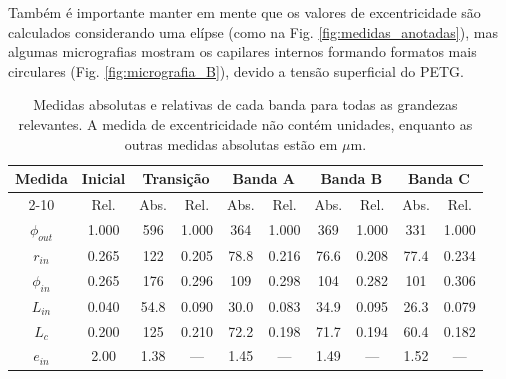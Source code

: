 \documentclass[12pt,a4paper]{article}
\begin{document}
  Também é importante manter em mente que os valores de excentricidade são calculados considerando uma elípse (como na Fig. \ref{fig:medidas_anotadas}), mas algumas micrografias mostram os capilares internos formando formatos mais circulares (Fig. \ref{fig:micrografia_B}), devido a tensão superficial do PETG.

  \begin{table}[H]
    \centering
    \begin{tabular}{c|c|cc|cc|cc|cc}
      \multirow{2}{*}{Medida} & Inicial & \multicolumn{2}{c|}{Transição} & \multicolumn{2}{c|}{Banda A} & \multicolumn{2}{c|}{Banda B} & \multicolumn{2}{c}{Banda C} \\
      \cline{2-10}
      & Rel. & Abs. & Rel. & Abs. & Rel. & Abs. & Rel. & Abs. & Rel. \\
      \hline
      $\phi_{out}$       & 1.000
                   & 596 & 1.000
                   & 364 & 1.000
                   & 369 & 1.000
                   & 331 & 1.000 \\
      $r_{in}$        & 0.265
               & 122 & 0.205
               & 78.8 & 0.216
               & 76.6 & 0.208
               & 77.4 & 0.234 \\
      $\phi_{in}$       & 0.265
                  & 176 & 0.296
                  & 109 & 0.298
                  & 104 & 0.282
                  & 101 & 0.306 \\
      $L_{in}$        & 0.040
               & 54.8 & 0.090
               & 30.0 & 0.083
               & 34.9 & 0.095
               & 26.3 & 0.079 \\
      $L_{c}$        & 0.200
              & 125 & 0.210
              & 72.2 & 0.198
              & 71.7 & 0.194
              & 60.4 & 0.182 \\
      $e_{in}$       & 2.00
              & 1.38 & ---
              & 1.45 & ---
              & 1.49 & ---
              & 1.52 & --- \\
    \end{tabular}
    \caption{Medidas absolutas e relativas de cada banda para todas as grandezas relevantes.
    A medida de excentricidade não contém unidades, enquanto as outras medidas absolutas estão em $\mu$m.}
    \label{tab:medidas_abs_rel}
  \end{table}
\end{document}
